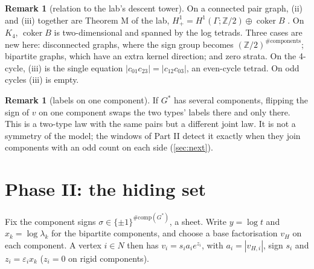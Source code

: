 \documentclass[11pt]{article}
\theoremstyle{definition}\newtheorem{definition}[theorem]{Definition}\newtheorem{remark}[theorem]{Remark}\newtheorem{example}[theorem]{Example}
\begin{document}
\begin{remark}[relation to the lab's descent tower]
On a connected pair graph, (ii) and (iii) together are Theorem M of the lab, $H^1_+=H^1(\Gamma;\mathbb Z/2)\oplus\operatorname{coker}B$
\cite[Theorem M]{Lab}. On $K_4$, $\operatorname{coker}B$ is two-dimensional and spanned by the log tetrads. Three cases are new here:
disconnected graphs, where the sign group becomes $(\mathbb Z/2)^{\#\text{components}}$; bipartite graphs, which have an extra kernel
direction; and zero strata. On the 4-cycle, (iii) is the single equation $|c_{01}c_{23}|=|c_{12}c_{03}|$, an even-cycle tetrad. On odd
cycles (iii) is empty.
\end{remark}

\begin{remark}[labels on one component]
If $G^*$ has several components, flipping the sign of $v$ on one component swaps the two types' labels there and only there. This is a
two-type law with the same pairs but a different joint law. It is not a symmetry of the model; the windows of Part II detect it exactly
when they join components with an odd count on each side (\cref{sec:next}).
\end{remark}

\section{Phase II: the hiding set}\label{sec:hiding}
Fix the component signs $\sigma\in\{\pm1\}^{\#\text{comp}(G^*)}$, a sheet. Write $y=\log t$ and $x_k=\log\lambda_k$ for the bipartite
components, and choose a base factorisation $v_H$ on each component. A vertex $i\in N$ then has $v_i=s_ia_ie^{z_i}$, with $a_i=|v_{H,i}|$,
sign $s_i$ and $z_i=\varepsilon_ix_k$ ($z_i=0$ on rigid components).
\end{document}
